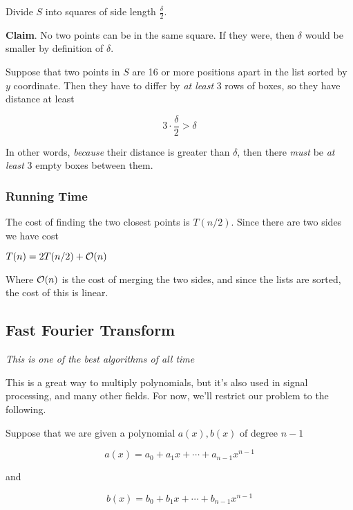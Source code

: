 \documentclass[12pt]{article}
\begin{document}
  {
    Divide $S$ into squares of side length $\frac{\delta}{2}$.

    {\bf Claim}. No two points can be in the same square. If they were, then
    $\delta$ would be smaller by definition of $\delta$.

    Suppose that two points in $S$ are 16 or more positions apart in the list sorted
    by $y$ coordinate. Then they have to differ by {\it at least} 3 rows of boxes,
    so they have distance at least

    \[
      3 \cdot \frac{\delta}{2} > \delta
    \]

    In other words, {\it because} their distance is greater than $\delta$, then
    there {\it must} be {\it at least} 3 empty boxes between them.
  }


  \subsubsection{Running Time}

  The cost of finding the two closest points is $T(n / 2)$. Since there are two
  sides we have cost

  $T(n) = 2T(n / 2) + \mathcal O(n)$

  Where $\mathcal O(n)$ is the cost of merging the two sides, and since the lists are
  sorted, the cost of this is linear.

  \subsection{Fast Fourier Transform}

  {\it This is one of the best algorithms of all time}

  This is a great way to multiply polynomials, but it's also used in signal
  processing, and many other fields. For now, we'll restrict our problem to the
  following.

  Suppose that we are given a polynomial $a(x), b(x)$ of degree $n - 1$

  \[
    a(x) = a_0 + a_1x + \cdots + a_{n - 1}x^{n - 1}
  \]

  and

  \[
    b(x) = b_0 + b_1x + \cdots + b_{n - 1}x^{n - 1}
  \]
\end{document}
